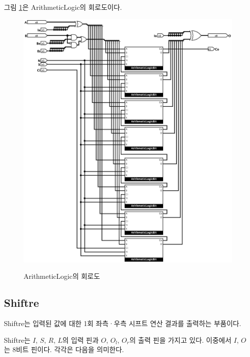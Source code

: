 \documentclass{article}
\renewcommand{\figurename}{그림}
\begin{document}
\figurename{} \ref{fig:al}은 ArithmeticLogic의 회로도이다.

\begin{figure}[p]
    \centering
    \includegraphics[scale=0.35]{ArithmeticLogic} \\
    \caption{ArithmeticLogic의 회로도}
    \label{fig:al}
\end{figure}

\pagebreak

\subsection{Shiftre}

Shiftre는 입력된 값에 대한 1회 좌측·우측 시프트 연산 결과를 출력하는
부품이다.

Shiftre는 $I$, $S$, $R$, $L$의 입력 핀과
$O$, $O_l$, $O_r$의 출력 핀을 가지고 있다.
이중에서 $I$, $O$는 8비트 핀이다.
각각은 다음을 의미한다.
\end{document}

